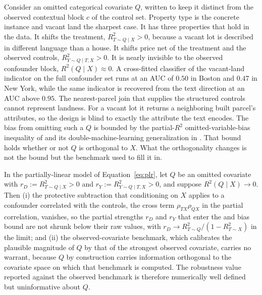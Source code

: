 Consider an omitted categorical covariate $Q$, written to keep it distinct from the observed contextual block $c$ of the control set. Property type is the concrete instance and vacant land the sharpest case. It has three properties that hold in the data. It shifts the treatment, $R^2_{T \sim Q \mid X} > 0$, because a vacant lot is
described in different language than a house. It shifts price net of the treatment and the observed controls, $R^2_{Y \sim Q \mid T, X} > 0$. It is nearly invisible to the observed confounder block, $R^2(Q \mid X) \approx 0$. A cross-fitted classifier of the vacant-land indicator on the full confounder set runs at an AUC of $0.50$ in Boston and $0.47$ in New York, while the same indicator is recovered from the text direction at an AUC above $0.95$. The nearest-parcel join that supplies the structured controls cannot represent landness. For a vacant lot it returns a neighboring built parcel's attributes, so the design is blind to exactly the attribute the text encodes. The bias from omitting such a $Q$ is bounded by the partial-$R^2$ omitted-variable-bias inequality of \citet{cinelli2020making} and its double-machine-learning generalization in \citet{chernozhukov2022long}. That bound holds whether or not $Q$ is orthogonal to $X$. What the orthogonality changes is not the bound but the benchmark used to
fill it in.

\begin{proposition}
\label{prop:coca}
In the partially-linear model of Equation~\eqref{eq:plr}, let $Q$ be an omitted
covariate with $r_D := R^2_{T \sim Q \mid X} > 0$ and
$r_Y := R^2_{Y \sim Q \mid T, X} > 0$, and suppose $R^2(Q \mid X) \to 0$. Then (i)
the protective subtraction that conditioning on $X$ applies to a confounder
correlated with the controls, the cross term $\rho_{TX}\rho_{QX}$ in the partial
correlation, vanishes, so the partial strengths $r_D$ and $r_Y$ that enter the
\citet{cinelli2020making} and \citet{chernozhukov2022long} bias bound are not
shrunk below their raw values, with $r_D \to R^2_{T \sim Q}/(1 - R^2_{T \sim X})$ in
the limit; and (ii) the
observed-covariate benchmark, which calibrates the plausible magnitude of $Q$ by
that of the strongest observed covariate, carries no warrant, because $Q$ by
construction carries information orthogonal to the covariate space on which that
benchmark is computed. The robustness value reported against the observed benchmark
is therefore numerically well defined but uninformative about $Q$.
\end{proposition}

